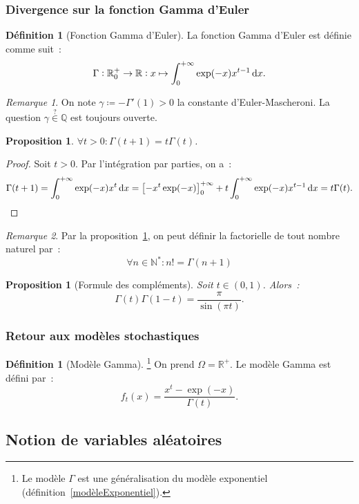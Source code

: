 \documentclass{article}
\newcommand{\N}{\mathbb N}
\newcommand{\Q}{\mathbb Q}
\newcommand{\R}{\mathbb R}
\newtheorem{prp}[thm]{Proposition}
\theoremstyle{definition}
\newtheorem{déf}[thm]{Définition}
\theoremstyle{remark}
\newtheorem*{rmq}{Remarque}
\begin{document}
		\subsubsection{Divergence sur la fonction Gamma d'Euler}

		\begin{déf}[Fonction Gamma d'Euler] La fonction Gamma d'Euler est définie comme suit~:
		\[\Gamma : \R_0^+ \to \R : x \mapsto \int_0^{+\infty}\exp(-x)x^{t-1}\dif x.\] \end{déf}

		\begin{rmq} On note $\gamma \coloneqq -\Gamma'(1) > 0$ la constante d'Euler-Mascheroni. La question $\gamma \stackrel{?}{\in} \Q$ est toujours ouverte.
		\end{rmq}

		\begin{prp}\label{GammaRecursif} $\forall t > 0 : \Gamma(t+1) = t\Gamma(t)$. \end{prp}

		\begin{proof} Soit $t > 0$. Par l'intégration par parties, on a~:
		\[\Gamma(t+1) = \int_0^{+\infty}\exp(-x)x^{t}\dif x = \left[-x^t\exp(-x)\right]_0^{+\infty} + t\int_0^{+\infty}\exp(-x)x^{t-1}\dif x = t\Gamma(t).\]
		\end{proof}

		\begin{rmq} Par la proposition~\ref{GammaRecursif}, on peut définir la factorielle de tout nombre naturel par~:
		\[\forall n \in \N^* : n! = \Gamma(n+1)\]
		\end{rmq}

		\begin{prp}[Formule des compléments] Soit $t \in (0, 1)$. Alors~:
		\[\Gamma(t)\Gamma(1-t) = \frac \pi{\sin(\pi t)}.\]
		\end{prp}

		\subsubsection{Retour aux modèles stochastiques}

		\begin{déf}[Modèle Gamma]\footnote{Le modèle $\Gamma$ est une généralisation du modèle exponentiel (définition~\ref{modèleExponentiel}).}
		On prend $\Omega = \R^+$. Le modèle Gamma est défini par~:
		\[f_t(x) = \frac {x^t-\exp(-x)}{\Gamma(t)}.\]
		\end{déf}

	\subsection{Notion de variables aléatoires}
\end{document}
